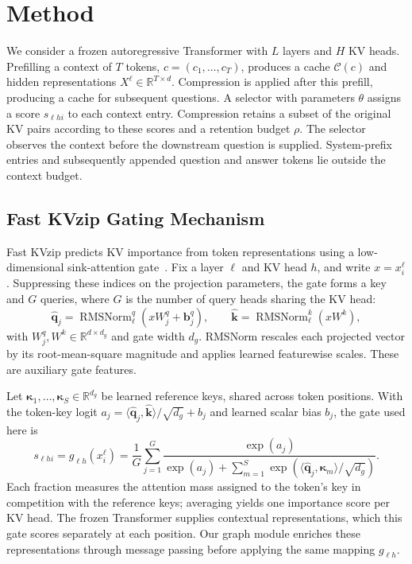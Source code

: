 \section{Method}
\label{sec:method}

We consider a frozen autoregressive Transformer with $L$ layers and $H$ KV heads. Prefilling a context of $T$ tokens, $c=(c_1,\ldots,c_T)$, produces a cache $\mathcal{C}(c)$ and hidden representations $X^{\ell}\in\mathbb{R}^{T\times d}$. Compression is applied after this prefill, producing a cache for subsequent questions. A selector with parameters $\theta$ assigns a score $s_{\ell h i}$ to each context entry. Compression retains a subset of the original KV pairs according to these scores and a retention budget $\rho$. The selector observes the context before the downstream question is supplied. System-prefix entries and subsequently appended question and answer tokens lie outside the context budget.

\subsection{Fast KVzip Gating Mechanism}
\label{sec:gate}

Fast KVzip predicts KV importance from token representations using a low-dimensional sink-attention gate~\citep{kim2026fastkvzip}. Fix a layer $\ell$ and KV head $h$, and write $x=x_i^{\ell}$. Suppressing these indices on the projection parameters, the gate forms a key and $G$ queries, where $G$ is the number of query heads sharing the KV head:
\begin{equation}
    \widehat{\mathbf q}_j=\operatorname{RMSNorm}_{\ell}^{q}\!\left(xW_j^q+\mathbf b_j^q\right),\qquad
    \widehat{\mathbf k}=\operatorname{RMSNorm}_{\ell}^{k}\!\left(xW^k\right),
    \label{eq:gate-features}
\end{equation}
with $W_j^q,W^k\in\mathbb{R}^{d\times d_g}$ and gate width $d_g$. RMSNorm rescales each projected vector by its root-mean-square magnitude and applies learned featurewise scales. These are auxiliary gate features.

Let $\boldsymbol\kappa_1,\ldots,\boldsymbol\kappa_S\in\mathbb{R}^{d_g}$ be learned reference keys, shared across token positions. With the token-key logit $a_j=\langle\widehat{\mathbf q}_j,\widehat{\mathbf k}\rangle/\sqrt{d_g}+b_j$ and learned scalar bias $b_j$, the gate used here is
\begin{equation}
    s_{\ell h i}=g_{\ell h}(x_i^{\ell})=
    \frac{1}{G}\sum_{j=1}^{G}
    \frac{\exp(a_j)}{\exp(a_j)+\sum_{m=1}^{S}
    \exp\!\left(\langle\widehat{\mathbf q}_j,\boldsymbol\kappa_m\rangle/\sqrt{d_g}\right)}.
    \label{eq:fastkvzip-gate}
\end{equation}
Each fraction measures the attention mass assigned to the token's key in competition with the reference keys; averaging yields one importance score per KV head. The frozen Transformer supplies contextual representations, which this gate scores separately at each position. Our graph module enriches these representations through message passing before applying the same mapping $g_{\ell h}$.

